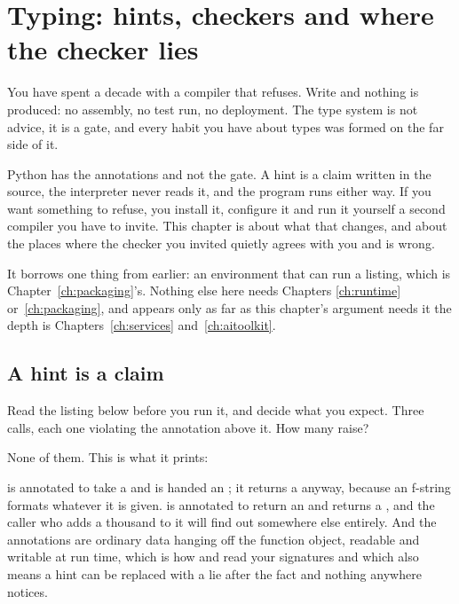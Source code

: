 
\chapter{Typing: hints, checkers and where the checker lies}
\label{ch:typing}

\noindent
You have spent a decade with a compiler that refuses. Write  and nothing is produced: no assembly, no test run, no deployment.
The type system is not advice, it is a gate, and every habit you have about
types was formed on the far side of it.

Python has the annotations and not the gate. A hint is a claim written in the
source, the interpreter never reads it, and the program runs either way. If
you want something to refuse, you install it, configure it and run it
yourself \dash{} a second compiler you have to invite. This chapter is about
what that changes, and about the places where the checker you invited quietly
agrees with you and is wrong.

It borrows one thing from earlier: an environment that can run a listing,
which is Chapter~\ref{ch:packaging}'s. Nothing else here needs Chapters
\ref{ch:runtime} or~\ref{ch:packaging}, and  appears only as
far as this chapter's argument needs it \dash{} the depth is
Chapters~\ref{ch:services} and~\ref{ch:aitoolkit}.

\section{A hint is a claim}
\label{sec:ch03-claim}

Read the listing below before you run it, and decide what you expect. Three
calls, each one violating the annotation above it. How many raise?


\noindent
None of them. This is what it prints:


\noindent
{} is annotated to take a  and is handed an ; it
returns a  anyway, because an f-string formats whatever it is
given.  is annotated to return an  and returns a
, and the caller who adds a thousand to it will find out somewhere
else entirely. And the annotations are ordinary data hanging off the function
object, readable and writable at run time, which is how  and
 read your signatures \dash{} and which also means a hint can be
replaced with a lie after the fact and nothing anywhere notices.

